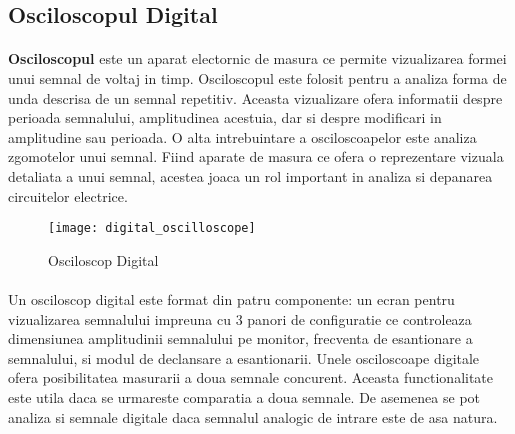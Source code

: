 




\subsection{Osciloscopul Digital}

\paragraph{}
{\bf Osciloscopul} este un aparat electornic de masura ce permite vizualizarea formei unui semnal de voltaj in timp. Osciloscopul este folosit pentru a analiza forma de unda descrisa de un semnal repetitiv. Aceasta vizualizare ofera informatii despre perioada semnalului, amplitudinea acestuia, dar si despre modificari in amplitudine sau perioada. O alta intrebuintare a osciloscoapelor este analiza zgomotelor unui semnal. Fiind aparate de masura ce ofera o reprezentare vizuala detaliata a unui semnal, acestea joaca un rol important in analiza si depanarea circuitelor electrice.

\begin{figure}[h]
\centering
\texttt{[image: digital\_oscilloscope]}
\caption{Osciloscop Digital}
\label{fig:digital_oscilloscope}
\end{figure}

\paragraph{}
Un osciloscop digital este format din patru componente: un ecran pentru vizualizarea semnalului impreuna cu 3 panori de configuratie ce controleaza dimensiunea amplitudinii semnalului pe monitor, frecventa de esantionare a semnalului, si modul de declansare a esantionarii. Unele osciloscoape digitale ofera posibilitatea masurarii a doua semnale concurent. Aceasta functionalitate este utila daca se urmareste comparatia a doua semnale. De asemenea se pot analiza si semnale digitale daca semnalul analogic de intrare este de asa natura.


